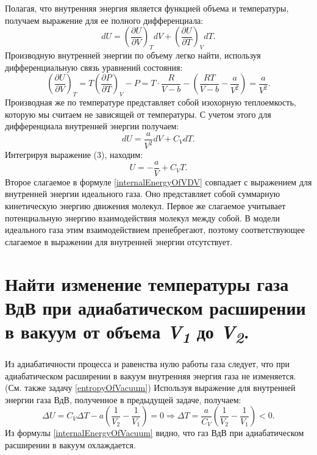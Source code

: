 \solving{}

Полагая, что внутренняя энергия является функцией объема и температуры,
получаем выражение для ее полного дифференциала:
\begin{equation}
  dU = \left ( \frac{\partial U}{\partial V}\right )_TdV + \left ( \frac{\partial U}{\partial T}\right )_VdT.
\end{equation}
Производную внутренней энергии по объему легко найти, используя
дифференциальную связь уравнений состояния:
\begin{equation}
  \left ( \frac{\partial U}{\partial V}\right )_T = T\left ( \frac{\partial P}{\partial T}\right )_V - P = T\cdot\frac{R}{V-b} - \left (\frac{RT}{V-b}-\frac{a}{V^2} \right ) = \frac{a}{V^2}.
\end{equation}
Производная же по температуре представляет собой изохорную теплоемкость,
которую мы считаем не зависящей от температуры. С учетом этого для
дифференциала внутренней энергии получаем:
\begin{equation}
  dU = \frac{a}{V^2}dV + C_VdT.
\end{equation}
Интегрируя выражение (3), находим:
\begin{equation} \label{internalEnergyOfVDV}
  U = -\frac{a}{V} + C_VT.
\end{equation}
Второе слагаемое в формуле \ref{internalEnergyOfVDV} совпадает с выражением для внутренней
энергии идеального газа. Оно представляет собой суммарную кинетическую
энергию движения молекул. Первое же слагаемое учитывает потенциальную
энергию взаимодействия молекул между собой. В модели идеального газа
этим взаимодействием пренебрегают, поэтому соответствующее слагаемое в
выражении для внутренней энергии отсутствует.

\section{Найти изменение температуры газа ВдВ при адиабатическом
расширении в вакуум от объема \emph{V\textsubscript{1}} до
\emph{V\textsubscript{2}}.}

\solving{}

Из адиабатичности процесса и равенства нулю работы газа следует, что при
адиабатическом расширении в вакуум внутренняя энергия газа не
изменяется. (См. также задачу \ref{entropyOfVacuum}) Используя выражение для внутренней
энергии газа ВдВ, полученное в предыдущей задаче, получаем:
\begin{equation} \label{internalEnergyOfVacuum}
  \Delta U = C_V\Delta T -a \left (\frac{1}{V_2} - \frac{1}{V_1} \right ) = 0 \Rightarrow \Delta T = \frac{a}{C_V}\left (\frac{1}{V_2} - \frac{1}{V_1} \right ) < 0.
\end{equation}
Из формулы \ref{internalEnergyOfVacuum} видно, что газ ВдВ при адиабатическом расширении в вакуум
охлаждается.

